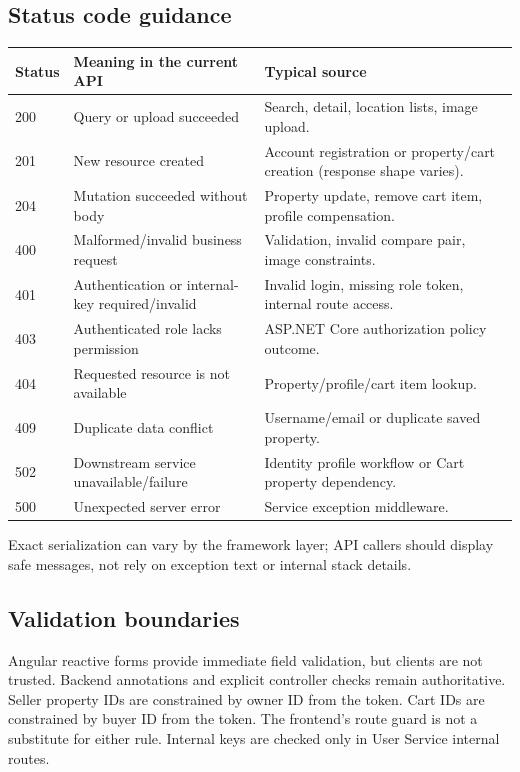 \documentclass[10pt,a4paper]{article}
\begin{document}
\subsection{Status code guidance}
\begin{longtable}{p{20mm} p{58mm} p{72mm}}
\toprule
Status & Meaning in the current API & Typical source\\
\midrule
\endhead
200 & Query or upload succeeded & Search, detail, location lists, image upload.\\
201 & New resource created & Account registration or property/cart creation (response shape varies).\\
204 & Mutation succeeded without body & Property update, remove cart item, profile compensation.\\
400 & Malformed/invalid business request & Validation, invalid compare pair, image constraints.\\
401 & Authentication or internal-key required/invalid & Invalid login, missing role token, internal route access.\\
403 & Authenticated role lacks permission & ASP.NET Core authorization policy outcome.\\
404 & Requested resource is not available & Property/profile/cart item lookup.\\
409 & Duplicate data conflict & Username/email or duplicate saved property.\\
502 & Downstream service unavailable/failure & Identity profile workflow or Cart property dependency.\\
500 & Unexpected server error & Service exception middleware.\\
\bottomrule
\end{longtable}
Exact serialization can vary by the framework layer; API callers should display safe
messages, not rely on exception text or internal stack details.

\subsection{Validation boundaries}
Angular reactive forms provide immediate field validation, but clients are not
trusted. Backend annotations and explicit controller checks remain authoritative.
Seller property IDs are constrained by owner ID from the token. Cart IDs are
constrained by buyer ID from the token. The frontend's route guard is not a substitute
for either rule. Internal keys are checked only in User Service internal routes.
\end{document}
